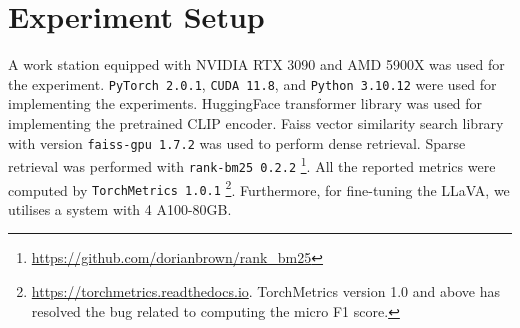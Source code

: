 \documentclass[11pt]{article}
\newcommand{\code}[1]{\colorbox{light-gray}{\texttt{#1}}}
\begin{document}
\section{Experiment Setup}
\label{appendix:exp_setup}
A work station equipped with NVIDIA RTX 3090 and AMD 5900X was used for the experiment. \code{PyTorch 2.0.1}, \code{CUDA 11.8}, and \code{Python 3.10.12} were used for implementing the experiments. HuggingFace transformer library \cite{HuggingFace_trans_2019} was used for implementing the pretrained CLIP encoder. Faiss \cite{johnson_Faiss2019billion} vector similarity search library with version \code{faiss-gpu 1.7.2} was used to perform dense retrieval. Sparse retrieval was performed with \code{rank-bm25 0.2.2} \footnote{\href{https://github.com/dorianbrown/rank\_bm25}{https://github.com/dorianbrown/rank\_bm25}}. All the reported metrics were computed by \code{TorchMetrics 1.0.1} \footnote{\href{https://torchmetrics.readthedocs.io}{https://torchmetrics.readthedocs.io}. TorchMetrics version 1.0 and above has resolved the bug related to computing the micro F1 score.}.
Furthermore, for fine-tuning the LLaVA\cite{LiuLLAVA2023}, we utilises a system with 4 A100-80GB. 
\end{document}
